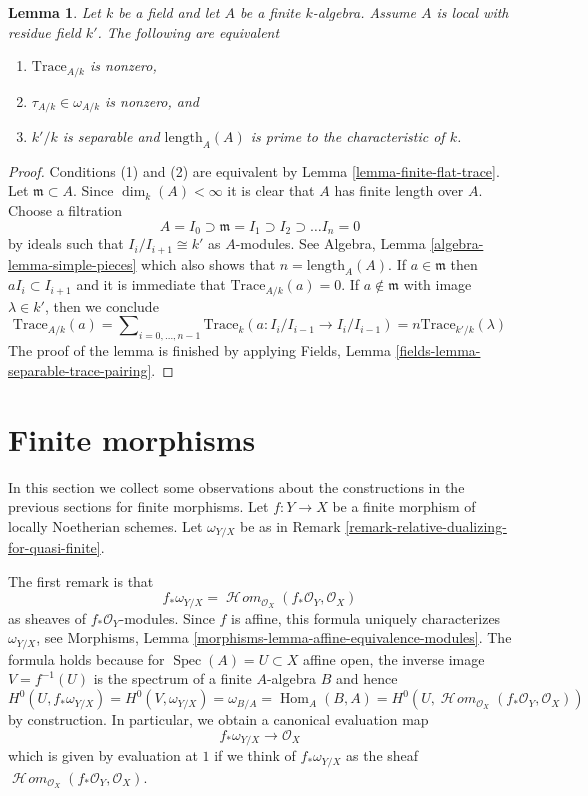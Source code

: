 \documentclass{stacks-project}
\theoremstyle{plain}
\newtheorem{lemma}[subsection]{Lemma}
\theoremstyle{definition}
\theoremstyle{remark}
\numberwithin{equation}{subsection}
\def\Spec{\mathop{\mathrm{Spec}}}
\def\Hom{\mathop{\mathrm{Hom}}\nolimits}
\def\SheafHom{\mathop{\mathcal{H}\!\mathit{om}}\nolimits}
\begin{document}
\begin{lemma}
\label{lemma-tau-nonzero}
Let $k$ be a field and let $A$ be a finite $k$-algebra. Assume $A$
is local with residue field $k'$. The following are equivalent
\begin{enumerate}
\item $\text{Trace}_{A/k}$ is nonzero,
\item $\tau_{A/k} \in \omega_{A/k}$ is nonzero, and
\item $k'/k$ is separable and $\text{length}_A(A)$ is prime
to the characteristic of $k$.
\end{enumerate}
\end{lemma}

\begin{proof}
Conditions (1) and (2) are equivalent by Lemma \ref{lemma-finite-flat-trace}.
Let $\mathfrak m \subset A$. Since $\dim_k(A) < \infty$ it is clear that
$A$ has finite length over $A$. Choose a filtration
$$
A = I_0 \supset \mathfrak m = I_1 \supset I_2 \supset \ldots I_n = 0
$$
by ideals such that $I_i/I_{i + 1} \cong k'$ as $A$-modules. See
Algebra, Lemma \ref{algebra-lemma-simple-pieces} which also shows that
$n = \text{length}_A(A)$. If $a \in \mathfrak m$ then $aI_i \subset I_{i + 1}$
and it is immediate that $\text{Trace}_{A/k}(a) = 0$.
If $a \not \in \mathfrak m$ with image $\lambda \in k'$, then
we conclude
$$
\text{Trace}_{A/k}(a) =
\sum\nolimits_{i = 0, \ldots, n - 1}
\text{Trace}_k(a : I_i/I_{i - 1} \to I_i/I_{i - 1}) =
n \text{Trace}_{k'/k}(\lambda)
$$
The proof of the lemma is finished by applying
Fields, Lemma \ref{fields-lemma-separable-trace-pairing}.
\end{proof}






\section{Finite morphisms}
\label{section-finite-morphisms}

\noindent
In this section we collect some observations about the
constructions in the previous sections for finite morphisms.
Let $f : Y \to X$ be a finite morphism of locally Noetherian schemes.
Let $\omega_{Y/X}$ be as in
Remark \ref{remark-relative-dualizing-for-quasi-finite}.

\medskip\noindent
The first remark is that
$$
f_*\omega_{Y/X} = \SheafHom_{\mathcal{O}_X}(f_*\mathcal{O}_Y, \mathcal{O}_X)
$$
as sheaves of $f_*\mathcal{O}_Y$-modules. Since $f$ is affine, this
formula uniquely characterizes $\omega_{Y/X}$, see
Morphisms, Lemma \ref{morphisms-lemma-affine-equivalence-modules}.
The formula holds because for $\Spec(A) = U \subset X$ affine open, the
inverse image $V = f^{-1}(U)$ is the spectrum of a finite $A$-algebra
$B$ and hence
$$
H^0(U, f_*\omega_{Y/X}) =
H^0(V, \omega_{Y/X}) =
\omega_{B/A} =
\Hom_A(B, A) =
H^0(U, \SheafHom_{\mathcal{O}_X}(f_*\mathcal{O}_Y, \mathcal{O}_X))
$$
by construction. In particular, we obtain a canonical evaluation map
$$
f_*\omega_{Y/X} \longrightarrow \mathcal{O}_X
$$
which is given by evaluation at $1$ if we think of $f_*\omega_{Y/X}$
as the sheaf $\SheafHom_{\mathcal{O}_X}(f_*\mathcal{O}_Y, \mathcal{O}_X)$.
\end{document}

